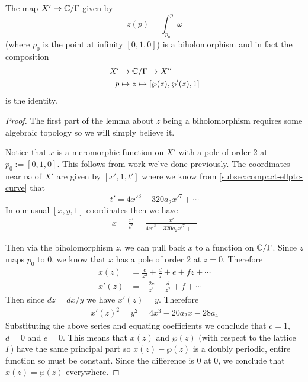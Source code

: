 \begin{lemma}
    The map $X' \to \mathbb{C}/\Gamma$ given by 
    $$z(p) = \int_{p_0}^p \omega$$
    (where $p_0$ is the point at infinity $[0, 1, 0]$) is a biholomorphism and in fact the composition
    \begin{align*}
        X' &\to \mathbb{C}/\Gamma \to X''\\
        p &\mapsto z \mapsto [\wp(z), \wp'(z), 1]
    \end{align*}
    is the identity.
\end{lemma}
\begin{proof}
    The first part of the lemma about $z$ being a biholomorphism requires some algebraic topology so we will simply believe it.

    Notice that $x$ is a meromorphic function on $X'$ with a pole of order 2 at $p_0 := [0, 1, 0]$. This follows from work we've done previously. 
    The coordinates near $\infty$ of $X'$ are given by $[x', 1, t']$ where we know from \autoref{subsec:compact-ellptc-curve} that 
    $$t' = 4x'^3 - 320a_2 x'^7 + \cdots$$
    In our usual $[x, y, 1]$ coordinates then we have 
    \begin{align*}
        x = \frac{x'}{t'} = \frac{x'}{4x'^3 - 320a_2 x'^7 + \cdots}
    \end{align*}

    Then via the biholomorphism $z$, we can pull back $x$ to a function on $\mathbb{C}/\Gamma$. Since $z$ maps $p_0$ to 0, we know that $x$ has a pole of order 2 at $z = 0$. Therefore 
    \begin{align*}
        x(z) &= \frac{c}{z^2} + \frac{d}{z} + e + fz + \cdots \\
        x'(z) &= -\frac{2c}{z^3} - \frac{d}{z^2} + f + \cdots
    \end{align*}
    Then since $dz = dx/y$ we have $x'(z) = y$. Therefore 
    \begin{align*}
        x'(z)^2 = y^2 = 4x^3 - 20a_2 x - 28a_4
    \end{align*}
    Substituting the above series and equating coefficients we conclude that $c = 1$, $d = 0$ and $e = 0$. This means that $x(z)$ and $\wp(z)$ (with respect to the lattice $\Gamma$) have the same principal part so $x(z) - \wp(z)$ is a doubly periodic, entire function so must be constant. Since the difference is 0 at 0, we conclude that $x(z) = \wp(z)$ everywhere.
\end{proof}